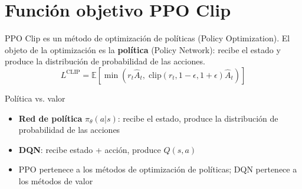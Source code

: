 \section{Función objetivo PPO Clip}
PPO Clip es un método de optimización de políticas (Policy Optimization). El objeto de la optimización es la \textbf{política} (Policy Network): recibe el estado y produce la distribución de probabilidad de las acciones.
$$L^{\text{CLIP}} = \mathbb{E}\left[\min\left(r_t \hat{A}_t,\; \text{clip}(r_t, 1{-}\epsilon, 1{+}\epsilon)\hat{A}_t\right)\right]$$

\begin{knowledgebox}{Política vs. valor}
\begin{itemize}
  \item \textbf{Red de política} $\pi_\theta(a|s)$: recibe el estado, produce la distribución de probabilidad de las acciones
  \item \textbf{DQN}: recibe estado + acción, produce $Q(s,a)$
  \item PPO pertenece a los métodos de optimización de políticas; DQN pertenece a los métodos de valor
\end{itemize}
\end{knowledgebox}

